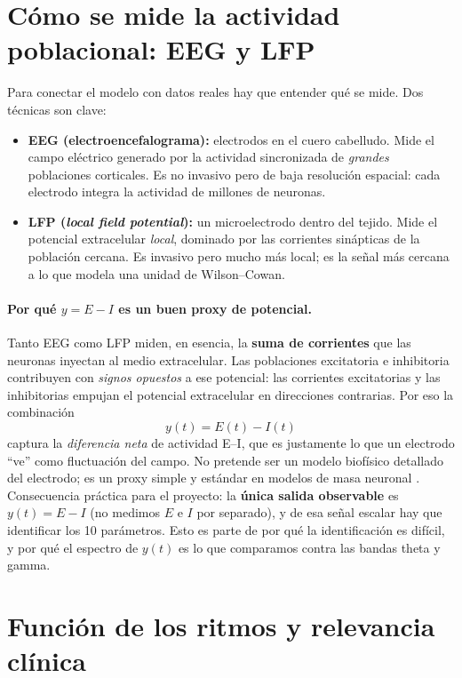 \documentclass[11pt,a4paper]{article}
\begin{document}
\section{Cómo se mide la actividad poblacional: EEG y LFP}

Para conectar el modelo con datos reales hay que entender qué se mide. Dos técnicas son
clave:
\begin{itemize}[nosep]
  \item \textbf{EEG (electroencefalograma):} electrodos en el cuero cabelludo. Mide el
        campo eléctrico generado por la actividad sincronizada de \emph{grandes}
        poblaciones corticales. Es no invasivo pero de baja resolución espacial: cada
        electrodo integra la actividad de millones de neuronas.
  \item \textbf{LFP (\emph{local field potential}):} un microelectrodo dentro del
        tejido. Mide el potencial extracelular \emph{local}, dominado por las
        corrientes sinápticas de la población cercana. Es invasivo pero mucho más
        local; es la señal más cercana a lo que modela una unidad de Wilson--Cowan.
\end{itemize}

\paragraph{Por qué $y = E - I$ es un buen proxy de potencial.}
Tanto EEG como LFP miden, en esencia, la \textbf{suma de corrientes} que las neuronas
inyectan al medio extracelular. Las poblaciones excitatoria e inhibitoria contribuyen
con \emph{signos opuestos} a ese potencial: las corrientes excitatorias y las
inhibitorias empujan el potencial extracelular en direcciones contrarias. Por eso la
combinación
$$y(t) = E(t) - I(t)$$
captura la \emph{diferencia neta} de actividad E--I, que es justamente lo que un
electrodo ``ve'' como fluctuación del campo. No pretende ser un modelo biofísico
detallado del electrodo; es un proxy simple y estándar en modelos de masa neuronal
\cite{deco2008dynamicbrain}. Consecuencia práctica para el proyecto: la \textbf{única
salida observable} es $y(t)=E-I$ (no medimos $E$ e $I$ por separado), y de esa señal
escalar hay que identificar los 10 parámetros. Esto es parte de por qué la
identificación es difícil, y por qué el espectro de $y(t)$ es lo que comparamos contra
las bandas theta y gamma.

\section{Función de los ritmos y relevancia clínica}
\end{document}
